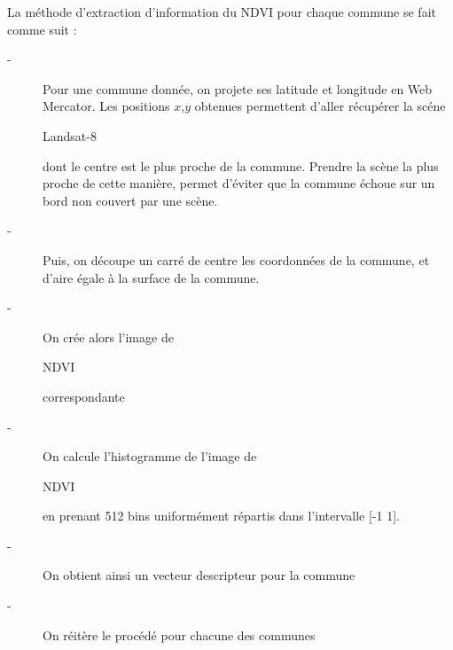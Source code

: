 \documentclass{book}
\begin{document}
La méthode d'extraction d'information du NDVI pour chaque commune se fait comme suit :
\begin{description}
\item[-] Pour une commune donnée, on projete ses latitude et longitude en Web Mercator. Les positions $x$,$y$ obtenues permettent d'aller récupérer 
la scéne \begin{itshape}Landsat-8\end{itshape} dont le centre est le plus proche de la commune. Prendre la scène la plus proche de cette manière,
permet d'éviter que la commune échoue sur un bord non couvert par une scène.
\item[-] Puis, on découpe un carré de centre les coordonnées de la  commune, et d'aire égale à la surface de la commune.
\item[-] On crée alors l'image de \begin{itshape}NDVI\end{itshape} correspondante
\item[-] On calcule l'histogramme de l'image de \begin{itshape}NDVI\end{itshape} en prenant 512 bins uniformément répartis dans l'intervalle [-1 1].
\item[-] On obtient ainsi un vecteur descripteur pour la commune
\item[-] On réitère le procédé pour chacune des communes
\end{description}
\end{document}
